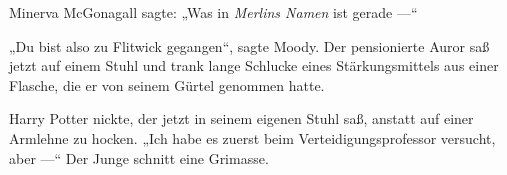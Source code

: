 Minerva McGonagall sagte:
„Was in \emph{Merlins Namen} ist gerade —“

\later

„Du bist also zu Flitwick gegangen“, sagte Moody. Der pensionierte Auror saß jetzt auf einem Stuhl und trank lange Schlucke eines Stärkungsmittels aus einer Flasche, die er von seinem Gürtel genommen hatte.

Harry Potter nickte, der jetzt in seinem eigenen Stuhl saß, anstatt auf einer Armlehne zu hocken.
„Ich habe es zuerst beim Verteidigungsprofessor versucht, aber —“ Der Junge schnitt eine Grimasse.
